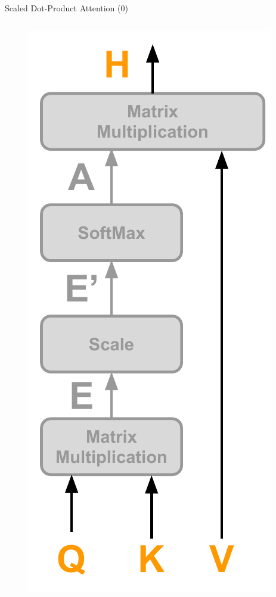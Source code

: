 \documentclass[10pt]{beamer}
\begin{document}
\begin{frame}[fragile]{Scaled Dot-Product Attention (0)}
    \begin{columns}
        \begin{figure}
            \centering
            \includegraphics[width=\textwidth]{figures/model/attention_step0-type2.pdf}
        \end{figure}


\end{columns}
\end{frame}
\end{document}
